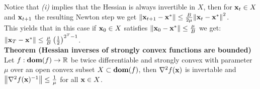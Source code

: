 Notice that \textit{(i)} implies that the Hessian is always invertible in $X$, then for $\mathbf{x}_t \in X$ and $\mathbf{x}_{t+1}$ the resulting Newton step we get $\norm{\mathbf{x}_{t+1} - \mathbf{x}^*} \leq \frac{B}{2\mu}\norm{\mathbf{x}_t - \mathbf{x}^*}^2$. \\
This yields that in this case if $\mathbf{x}_0 \in X$ satisfies $\norm{\mathbf{x}_0 - \mathbf{x}^*} \leq \frac{\mu}{B}$ we get: $\norm{\mathbf{x}_T - \mathbf{x}^*} \leq \frac{\mu}{B} \left(\frac{1}{2} \right)^{2^T -1}$. \\
\textbf{Theorem (Hessian inverses of strongly convex functions are bounded)} Let $f : \textbf{dom}(f) \rightarrow \mathbb{R}$ be twice differentiable and strongly convex with parameter $\mu$ over an open convex subset $X \subset \textbf{dom}(f)$, then $\nabla^2 f(\mathbf{x})$ is invertable and $\norm{\nabla^2 f(\mathbf{x})^{-1}} \leq \frac{1}{\mu}$ for all $\mathbf{x} \in X$. 